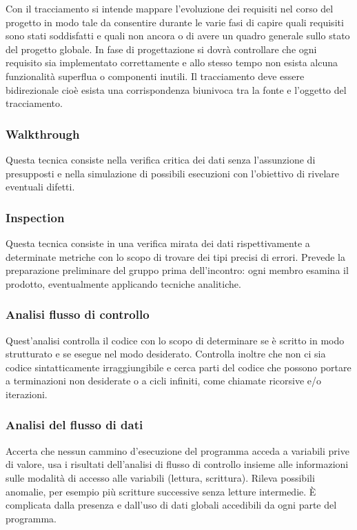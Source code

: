 Con il tracciamento si intende mappare l'evoluzione dei requisiti nel corso del
progetto in modo tale da consentire durante le varie fasi di capire quali
requisiti sono stati soddisfatti e quali non ancora o di avere un quadro
generale sullo stato del progetto globale. In fase di progettazione si dovr\`a
controllare che ogni requisito sia implementato correttamente e allo stesso
tempo non esista alcuna funzionalit\`a superflua o componenti inutili. Il
tracciamento deve essere bidirezionale cio\`e esista una
corrispondenza biunivoca tra la fonte e l'oggetto del tracciamento.

\subsubsection*{Walkthrough}

Questa tecnica consiste nella verifica critica dei dati senza
l'assunzione di presupposti e nella simulazione di possibili esecuzioni con l'obiettivo
di rivelare eventuali difetti.

\subsubsection*{Inspection}

Questa tecnica consiste in una verifica mirata dei dati rispettivamente a
determinate metriche con lo scopo di trovare dei tipi precisi di errori.
Prevede la preparazione preliminare del gruppo prima dell'incontro: ogni membro esamina il prodotto, eventualmente applicando tecniche analitiche.

\subsubsection*{Analisi flusso di controllo}

Quest'analisi controlla il codice con lo scopo di determinare se \`e scritto in
modo strutturato e se esegue nel modo desiderato. Controlla inoltre che non ci
sia codice sintatticamente irraggiungibile e cerca parti del codice che possono
portare a terminazioni non desiderate o a cicli infiniti, come chiamate
ricorsive e/o iterazioni.

\subsubsection*{Analisi del flusso di dati}

Accerta che nessun cammino d'esecuzione del programma acceda a variabili prive
di valore, usa i risultati dell'analisi di flusso di controllo insieme alle
informazioni sulle modalit\`a di accesso alle variabili (lettura, scrittura).
Rileva possibili anomalie, per esempio pi\`u scritture successive senza letture
intermedie. \`E complicata dalla presenza e dall'uso di dati globali accedibili
da ogni parte del programma.

